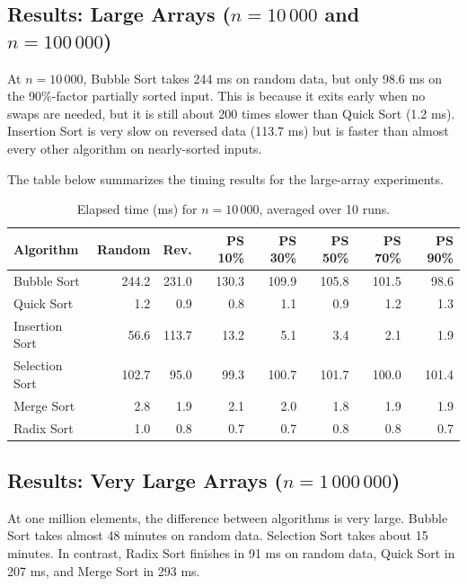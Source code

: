 \documentclass[12pt,a4paper]{article}
\theoremstyle{definition}
\begin{document}
\subsection{Results: Large Arrays ($n = 10\,000$ and $n = 100\,000$)}

At $n = 10\,000$, Bubble Sort takes 244 ms on random data, but only 98.6 ms on the 90\%-factor partially sorted input. This is because it exits early when no swaps are needed, but it is still about 200 times slower than Quick Sort (1.2 ms). Insertion Sort is very slow on reversed data (113.7 ms) but is faster than almost every other algorithm on nearly-sorted inputs.

The table below summarizes the timing results for the large-array experiments.

\begin{table}[H]
\centering
\caption{Elapsed time (ms) for $n=10\,000$, averaged over 10 runs.}
\label{tab:n10000}
\small
\begin{tabular}{lrrrrrrr}
\toprule
\textbf{Algorithm} & \textbf{Random} & \textbf{Rev.} & \textbf{PS 10\%} & \textbf{PS 30\%} & \textbf{PS 50\%} & \textbf{PS 70\%} & \textbf{PS 90\%} \\
\midrule
Bubble Sort     & 244.2  & 231.0  & 130.3 & 109.9 & 105.8 & 101.5 &  98.6 \\
Quick Sort      &   1.2  &   0.9  &   0.8 &   1.1 &   0.9 &   1.2 &   1.3 \\
Insertion Sort  &  56.6  & 113.7  &  13.2 &   5.1 &   3.4 &   2.1 &   1.9 \\
Selection Sort  & 102.7  &  95.0  &  99.3 & 100.7 & 101.7 & 100.0 & 101.4 \\
Merge Sort      &   2.8  &   1.9  &   2.1 &   2.0 &   1.8 &   1.9 &   1.9 \\
Radix Sort      &   1.0  &   0.8  &   0.7 &   0.7 &   0.8 &   0.8 &   0.7 \\
\bottomrule
\end{tabular}
\end{table}

\subsection{Results: Very Large Arrays ($n = 1\,000\,000$)}

At one million elements, the difference between algorithms is very large. Bubble Sort takes almost 48 minutes on random data. Selection Sort takes about 15 minutes. In contrast, Radix Sort finishes in 91 ms on random data, Quick Sort in 207 ms, and Merge Sort in 293 ms.
\end{document}
